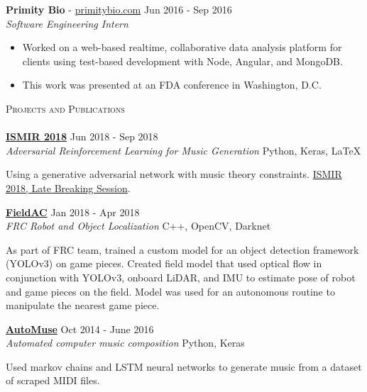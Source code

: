 \documentclass[a4paper]{article}
\newcommand{\lineunder} {
	\vspace*{-8pt} \\
	\hspace*{-18pt} \hrulefill \\
}
\newcommand{\header} [1] {
	{\hspace*{-18pt}\vspace*{6pt} \textsc{#1}}
	\vspace*{-6pt} \lineunder
}
\begin{document}
\noindent
\textbf{Primity Bio} - \url{primitybio.com} \hfill Jun 2016 - Sep 2016\\
\textit{Software Engineering Intern} \\
\vspace{-6mm}
\begin{itemize} \itemsep 0.1pt
	\item Worked on a web-based realtime, collaborative data analysis platform for clients using test-based development with Node, Angular, and MongoDB.
	\item This work was presented at an FDA conference in Washington, D.C.
\end{itemize}



\header{Projects and Publications}
\noindent
\href{http://ismir2018.ircam.fr/pages/events-lbd.html}{\textbf{ISMIR 2018}} \hfill Jun 2018 - Sep 2018\\
\textit{Adversarial Reinforcement Learning for Music Generation} \hfill Python, Keras, \LaTeX\\
\vspace{-25pt}
\begin{paragraph}{}
	\begin{sloppypar}

	Using a generative adversarial network with music theory constraints. \href{http://ismir2018.ircam.fr/pages/events-lbd.html}{ISMIR 2018, Late Breaking Session}.\\
	\end{sloppypar}

\end{paragraph}

\noindent
\href{https://github.com/RoboticsTeam4904/FieldAC}{\textbf{FieldAC}} \hfill Jan 2018 - Apr 2018\\
\textit{FRC Robot and Object Localization} \hfill C++, OpenCV, Darknet\\
\vspace{-25pt}
\begin{paragraph}{}
As part of FRC team, trained a custom model for an object detection framework (YOLOv3) on game pieces. Created field model that used optical flow in conjunction with YOLOv3, onboard LiDAR, and IMU to estimate pose of robot and game pieces on the field. Model was used for an autonomous routine to manipulate the nearest game piece.\\

\end{paragraph}
\noindent
\href{https://github.com/nacgarg/AutoMuse}{\textbf{AutoMuse}} \hfill Oct 2014 - June 2016\\
\textit{Automated computer music composition} \hfill Python, Keras
\vspace{-13pt}
\begin{paragraph}{}
Used markov chains and LSTM neural networks to generate music from a dataset of scraped MIDI files. \\ 

\end{paragraph}
\end{document}
